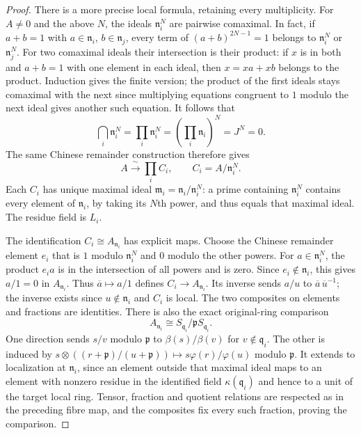 \begin{proof}
There is a more precise local formula, retaining every multiplicity.
For $A\ne0$ and the above $N$, the ideals $\mathfrak n_i^N$ are
pairwise comaximal. In fact, if $a+b=1$ with
$a\in\mathfrak n_i$, $b\in\mathfrak n_j$, every term of
$(a+b)^{2N-1}=1$ belongs to $\mathfrak n_i^N$ or $\mathfrak n_j^N$.
For two comaximal ideals their intersection is their product:
if $x$ is in both and $a+b=1$ with one element in each ideal,
then $x=xa+xb$ belongs to the product. Induction gives the finite
version; the product of the first ideals stays comaximal with
the next since multiplying equations congruent to $1$ modulo
the next ideal gives another such equation. It follows that
$$
\bigcap_i\mathfrak n_i^N
=\prod_i\mathfrak n_i^N
=\left(\prod_i\mathfrak n_i\right)^N
=J^N=0.
$$
The same Chinese remainder construction therefore gives
$$
A\xrightarrow{\ \sim\ }\prod_i C_i,
\qquad C_i=A/\mathfrak n_i^N.
$$
Each $C_i$ has unique maximal ideal
$\mathfrak m_i=\mathfrak n_i/\mathfrak n_i^N$: a prime
containing $\mathfrak n_i^N$ contains every element of
$\mathfrak n_i$, by taking its $N$th power, and thus equals
that maximal ideal. The residue field is $L_i$.

The identification $C_i\cong A_{\mathfrak n_i}$ has explicit maps.
Choose the Chinese remainder element $e_i$ that is $1$ modulo
$\mathfrak n_i^N$ and $0$ modulo the other powers. For
$a\in\mathfrak n_i^N$, the product $e_ia$ is in the intersection
of all powers and is zero. Since $e_i\notin\mathfrak n_i$,
this gives $a/1=0$ in $A_{\mathfrak n_i}$. Thus
$\overline a\mapsto a/1$ defines $C_i\to A_{\mathfrak n_i}$.
Its inverse sends $a/u$ to $\overline a\,\overline u^{-1}$;
the inverse exists since $u\notin\mathfrak n_i$ and $C_i$ is
local. The two composites on elements and fractions are identities.
There is also the exact original-ring comparison
$$
A_{\mathfrak n_i}\cong S_{\mathfrak q_i}/\mathfrak pS_{\mathfrak q_i}.
$$
One direction sends $s/v$ modulo $\mathfrak p$ to
$\beta(s)/\beta(v)$ for $v\notin\mathfrak q_i$.
The other is induced by
$s\otimes((r+\mathfrak p)/(u+\mathfrak p))
\mapsto s\varphi(r)/\varphi(u)$ modulo $\mathfrak p$.
It extends to localization at $\mathfrak n_i$, since an element
outside that maximal ideal maps to an element with nonzero
residue in the identified field $\kappa(\mathfrak q_i)$ and
hence to a unit of the target local ring. Tensor, fraction and
quotient relations are respected as in the preceding fibre map,
and the composites fix every such fraction, proving the comparison.


\end{proof}
